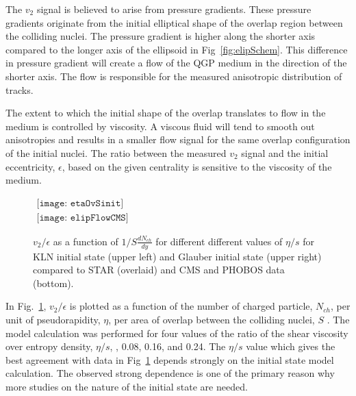     The $v_{2}$ signal is believed to arise from pressure gradients.
    These pressure gradients originate from the initial elliptical shape of 
      the overlap region between the colliding nuclei. 
    The pressure gradient is higher along the shorter axis compared to 
      the longer axis of the ellipsoid in Fig~\ref{fig:elipSchem}.
    This difference in pressure gradient will create a flow of the QGP 
      medium in the direction of the shorter axis. 
    The flow is responsible for the measured anisotropic distribution of 
      tracks. 

    The extent to which the initial shape of the overlap translates to flow
      in the medium is controlled by viscosity. 
    A viscous fluid will tend to smooth out anisotropies and results in 
      a smaller flow signal for the same overlap configuration of the initial
      nuclei. 
    The ratio between the measured $v_{2}$ signal and the initial 
      eccentricity, $\epsilon$, based on the given centrality is sensitive
      to the viscosity of the medium. 

    \begin{figure}[!Hhbt]
      \centering
      $ \begin{array}{cc}
        \texttt{[image: etaOvSinit]} \\
        \texttt{[image: elipFlowCMS]}
      \end{array} $
      \caption{$v_{2}/\epsilon$  as a function of $1/S \frac{dN_{ch}}{dy}$
        for different different values of $\eta/s$ for KLN initial state 
        (upper left) and Glauber initial state (upper right) compared to STAR (overlaid)
        and CMS and PHOBOS data (bottom).}
      \label{fig:elipFlow}
    \end{figure}

    In Fig.~\ref{fig:elipFlow}, $v_{2}/\epsilon$ is plotted as a function of 
      the number of charged particle, $N_{ch}$, per unit of pseudorapidity, 
      $\eta$, per area of overlap between the colliding nuclei, 
      $S$ \cite{etaOvSinit}. 
    The model calculation was performed for \DIFaddbegin {}\DIFaddend four values of the ratio of the 
      shear viscosity over entropy density, $\eta/s$, \DIFdelbegin {}\DIFdelend \DIFaddbegin {}, 0.08, 0.16, and 0.24.
    The $\eta/s$ value which gives the best agreement with data in 
      Fig~\ref{fig:elipFlow} depends strongly on the initial state model 
      calculation.
    The \DIFaddbegin {}\DIFaddend observed strong dependence is one of the primary reason
      why more studies on the nature of the initial state are needed.



